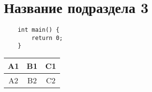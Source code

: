 \section{Название подраздела 3}

\begin{verbatim}
    int main() {
        return 0;
    }
\end{verbatim}
\label{listing:code_example}


\begin{center}
	    \begin{tabular}{|c|c|c|}
		        \hline
		        A1 & B1 & C1 \\ \hline
		        A2 & B2 & C2 \\ \hline
		    \end{tabular}
\end{center}
\label{tab:tab_example}
